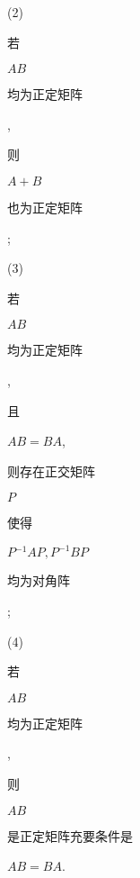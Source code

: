 \documentclass[10pt]{article}
\begin{document}
(2) \begin{CJK}{UTF8}{mj}若\end{CJK} $A B$ \begin{CJK}{UTF8}{mj}均为正定矩阵\end{CJK}, \begin{CJK}{UTF8}{mj}则\end{CJK} $A+B$ \begin{CJK}{UTF8}{mj}也为正定矩阵\end{CJK};

(3) \begin{CJK}{UTF8}{mj}若\end{CJK} $A B$ \begin{CJK}{UTF8}{mj}均为正定矩阵\end{CJK}, \begin{CJK}{UTF8}{mj}且\end{CJK} $A B=B A$, \begin{CJK}{UTF8}{mj}则存在正交矩阵\end{CJK} $P$ \begin{CJK}{UTF8}{mj}使得\end{CJK} $P{ }^{-1} A P, P^{-1} B P$ \begin{CJK}{UTF8}{mj}均为对角阵\end{CJK};

(4) \begin{CJK}{UTF8}{mj}若\end{CJK} $A B$ \begin{CJK}{UTF8}{mj}均为正定矩阵\end{CJK}, \begin{CJK}{UTF8}{mj}则\end{CJK} $A B$ \begin{CJK}{UTF8}{mj}是正定矩阵充要条件是\end{CJK} $A B=B A$.
\end{document}
